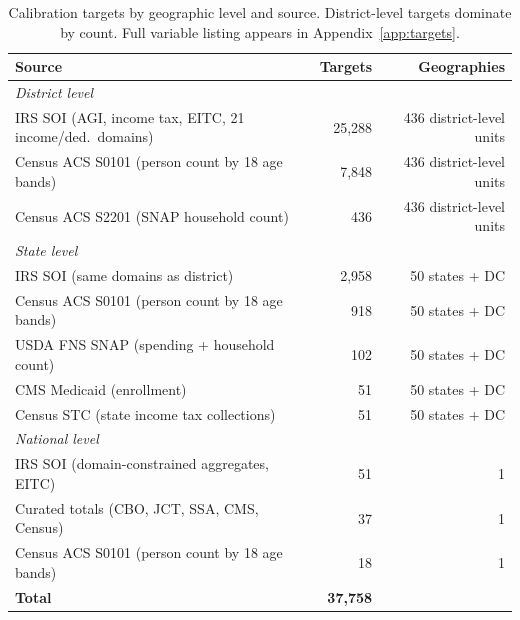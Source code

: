 \begin{table}[ht]
\centering
{\tablefont
\begin{tabular}{p{}rr}
\toprule
Source & Targets & Geographies \\
\midrule
\multicolumn{3}{l}{\textit{District level}} \\
IRS SOI (AGI, income tax, EITC, 21 income/ded.\ domains) & 25{,}288 & 436 district-level units \\
Census ACS S0101 (person count by 18 age bands) & 7{,}848 & 436 district-level units \\
Census ACS S2201 (SNAP household count) & 436 & 436 district-level units \\
\midrule
\multicolumn{3}{l}{\textit{State level}} \\
IRS SOI (same domains as district) & 2{,}958 & 50 states + DC \\
Census ACS S0101 (person count by 18 age bands) & 918 & 50 states + DC \\
USDA FNS SNAP (spending + household count) & 102 & 50 states + DC \\
CMS Medicaid (enrollment) & 51 & 50 states + DC \\
Census STC (state income tax collections) & 51 & 50 states + DC \\
\midrule
\multicolumn{3}{l}{\textit{National level}} \\
IRS SOI (domain-constrained aggregates, EITC) & 51 & 1 \\
Curated totals (CBO, JCT, SSA, CMS, Census) & 37 & 1 \\
Census ACS S0101 (person count by 18 age bands) & 18 & 1 \\
\midrule
\textbf{Total} & \textbf{37{,}758} & \\
\bottomrule
\end{tabular}
}
\caption{Calibration targets by geographic level and source. District-level targets dominate by
count. Full variable listing appears in Appendix~\ref{app:targets}.}
\label{tab:target_summary}
\end{table}
